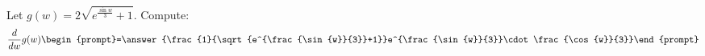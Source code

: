 \documentclass{ximera}
\author{Bart Snapp}
\begin{document}
\begin{exercise}
Let $g(w) = 2 \sqrt{e^{\frac{\sin{w}}{3}}+1}$. Compute:
\[
\frac{d}{dw}g(w)
\begin{prompt}=\answer{\frac{1}{\sqrt{e^{\frac{\sin{w}}{3}}+1}}e^{\frac{\sin{w}}{3}}\cdot \frac{\cos{w}}{3}}\end{prompt}
\]
\end{exercise}
\end{document}
